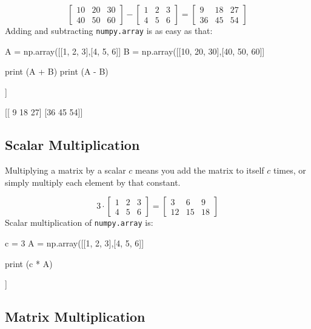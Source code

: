 \[
\begin{bmatrix}
10 & 20 & 30\\
40 & 50 & 60
\end{bmatrix}
-
\begin{bmatrix}
1 & 2 & 3 \\
4 & 5 & 6
\end{bmatrix}
=
\begin{bmatrix}
9 & 18 & 27\\
36 & 45 & 54
\end{bmatrix}
\]
Adding and subtracting \texttt{numpy.array} is as easy as that:

\begin{ipython}
A = np.array([[1, 2, 3],[4, 5, 6]]
B = np.array([[10, 20, 30],[40, 50, 60]]

print (A + B)
print (A - B)
\end{ipython}
\begin{ioutput}
[[11 22 33]
 [44 55 66]]
 
[[ 9 18 27]
 [36 45 54]]
\end{ioutput}

\subsection{Scalar Multiplication}\label{scalar-multiplication}

Multiplying a matrix by a scalar \(c\) means you add the matrix to itself \(c\) times, or simply multiply each element by that constant.

\[
3 \cdot
\begin{bmatrix}
1 & 2 & 3 \\
4 & 5 & 6
\end{bmatrix}
=
\begin{bmatrix}
3 & 6 & 9 \\
12 & 15 & 18
\end{bmatrix}
\]
Scalar multiplication of \texttt{numpy.array} is:

\begin{ipython}
c = 3
A = np.array([[1, 2, 3],[4, 5, 6]]

print (c * A)
\end{ipython}
\begin{ioutput}
[[ 3  6  9]
 [12 15 18]]
    \end{ioutput}

\subsection{Matrix Multiplication}\label{matrix-multiplication}

